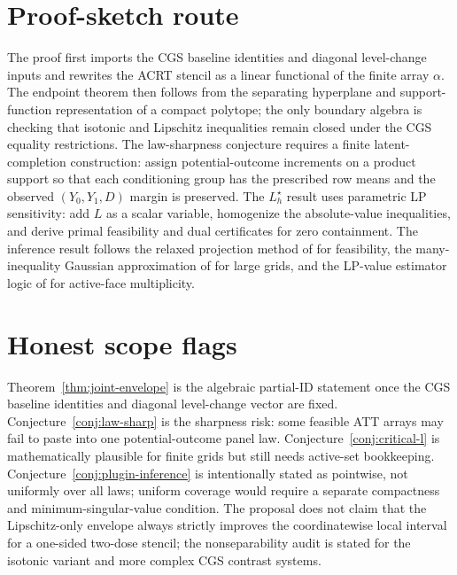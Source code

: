 \documentclass[11pt]{article}
\theoremstyle{definition}
\theoremstyle{plain}
\theoremstyle{remark}
\begin{document}
\section{Proof-sketch route}
The proof first imports the CGS baseline identities and diagonal level-change
inputs and
rewrites the ACRT stencil as a linear functional of the finite array
\(\alpha\).  The endpoint theorem then follows from the separating hyperplane
and support-function representation of a compact polytope; the only boundary
algebra is checking that isotonic and Lipschitz inequalities remain closed
under the CGS equality restrictions.  The law-sharpness conjecture requires a
finite latent-completion construction: assign potential-outcome increments on
a product support so that each conditioning group has the prescribed row means
and the observed \((Y_0,Y_1,D)\) margin is preserved.  The \(L_h^\star\) result
uses parametric LP sensitivity: add \(L\) as a scalar variable, homogenize the
absolute-value inequalities, and derive primal feasibility and dual
certificates for zero containment.  The inference result follows the relaxed
projection method of \citet{KaidoMolinariStoye2019} for feasibility, the
many-inequality Gaussian approximation of \citet{BelloniBugniChernozhukov2018}
for large grids, and the LP-value estimator logic of \citet{Voronin2025} for
active-face multiplicity.

\section{Honest scope flags}
Theorem~\ref{thm:joint-envelope} is the algebraic partial-ID statement once
the CGS baseline identities and diagonal level-change vector are fixed.  Conjecture~\ref{conj:law-sharp} is the
sharpness risk: some feasible ATT arrays may fail to paste into one
potential-outcome panel law.  Conjecture~\ref{conj:critical-l}
is mathematically plausible for finite grids but still needs active-set
bookkeeping.  Conjecture~\ref{conj:plugin-inference} is intentionally stated as
pointwise, not uniformly over all laws; uniform coverage would require a
separate compactness and minimum-singular-value condition.  The proposal does
not claim that the Lipschitz-only envelope always strictly improves the
coordinatewise local interval for a one-sided two-dose stencil; the
nonseparability audit is stated for the isotonic variant and more complex CGS
contrast systems.
\end{document}
